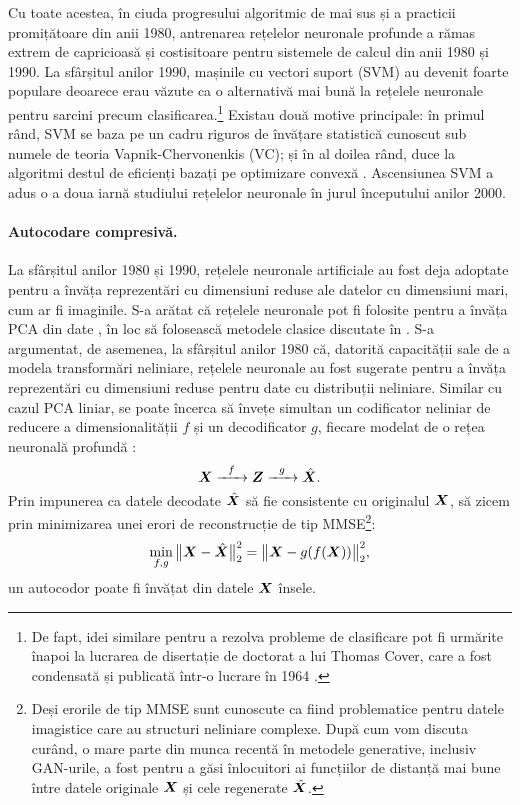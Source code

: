 \documentclass[../../book-main_ro.tex]{subfiles}
\begin{document}
Cu toate acestea, în ciuda progresului algoritmic de mai sus și a practicii promițătoare din anii 1980, antrenarea rețelelor neuronale profunde a rămas extrem de capricioasă și costisitoare pentru sistemele de calcul din anii 1980 și 1990. La sfârșitul anilor 1990, mașinile cu vectori suport (SVM) \cite{SVM-1995} au devenit foarte populare deoarece erau văzute ca o alternativă mai bună la rețelele neuronale pentru sarcini precum clasificarea.\footnote{De fapt, idei similare pentru a rezolva probleme de clasificare pot fi urmărite înapoi la lucrarea de disertație de doctorat a lui Thomas Cover, care a fost condensată și publicată într-o lucrare în 1964 \cite{Cover-1964}.} Existau două motive principale: în primul rând, SVM se baza pe un cadru riguros de învățare statistică cunoscut sub numele de teoria Vapnik-Chervonenkis (VC); și în al doilea rând, duce la algoritmi destul de eficienți bazați pe optimizare convexă \cite{BoydVa04}. Ascensiunea SVM a adus o a doua iarnă studiului rețelelor neuronale în jurul începutului anilor 2000.

\paragraph{Autocodare compresivă.}
La sfârșitul anilor 1980 și 1990, rețelele neuronale artificiale au fost deja adoptate pentru a învăța reprezentări cu dimensiuni reduse ale datelor cu dimensiuni mari, cum ar fi imaginile. S-a arătat că rețelele neuronale pot fi folosite pentru a învăța PCA din date \cite{Oja1982SimplifiedNM,Baldi89}, în loc să folosească metodele clasice discutate în . S-a argumentat, de asemenea, la sfârșitul anilor 1980 că, datorită capacității sale de a modela transformări neliniare, rețelele neuronale au fost sugerate pentru a învăța reprezentări cu dimensiuni reduse pentru date cu distribuții neliniare. Similar cu cazul PCA liniar, se poate încerca să învețe simultan un codificator neliniar de reducere a dimensionalității $f$ și un decodificator $g$, fiecare modelat de o rețea neuronală profundă \cite{Rumelhart1986,Kramer1991NonlinearPC}:
\begin{equation}
    \bm{X}   \xrightarrow{\hspace{2mm} f \hspace{2mm}} \bm{Z}  \xrightarrow{\hspace{2mm} g \hspace{2mm}} \hat {\bm{X}}.
       \label{eqn:auto-encoding-deep-networks}
\end{equation}
Prin impunerea ca datele decodate $\hat {\bm{X}}$ să fie consistente cu originalul $\bm{X}$, să zicem prin minimizarea unei erori de reconstrucție de tip MMSE\footnote{Deși erorile de tip MMSE sunt cunoscute ca fiind problematice pentru datele imagistice care au structuri neliniare complexe. După cum vom discuta curând, o mare parte din munca recentă în metodele generative, inclusiv GAN-urile, a fost pentru a găsi înlocuitori ai funcțiilor de distanță mai bune între datele originale $\bm{X}$ și cele regenerate $\hat {\bm{X}}$.}:
\begin{equation}
    \min_{f,g} \big\|\bm{X} - \hat {\bm{X}}\big\|_2^2 = \big\|\bm{X} - g(f( \bm{X}))\big\|_2^2,
\end{equation}
un autocodor poate fi învățat din datele $\bm{X}$ însele.
\end{document}
